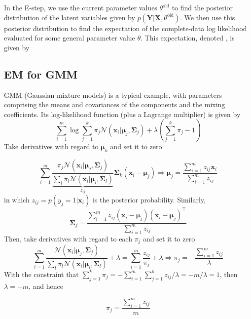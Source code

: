 \documentclass{article}
\begin{document}
	In the E-step, we use the current parameter values $\theta^{\mathrm{old}}$ to find the posterior distribution of the latent variables given by $p(\bm{Y}|\bm{X}, \theta^{\mathrm{old}})$. We then use this posterior distribution to find the expectation of the complete-data log likelihood evaluated for some general parameter value $\theta$. This expectation, denoted , is given by
	
	\subsection{EM for GMM}
	
	GMM (Gaussian mixture models) is a typical example, with parameters comprising the means and covariances of the components and the mixing coefficients. Its log-likelihood function (plus a Lagrange multiplier) is given by
	\begin{equation*}
	\sum_{i=1}^m \log \sum_{j=1}^k \pi_j \mathcal{N} (\bm{x}_i|\bm{\mu}_j,\bm{\Sigma}_j) + \lambda \left(\sum_{j=1}^k \pi_j - 1\right)
	\end{equation*}
	Take derivatives with regard to $\bm{\mu}_k$ and set it to zero
	
	\begin{equation}
	\label{eq:GMM_mu}
	\sum_{i=1}^m \underbrace{\frac{\pi_j  \mathcal{N} (\bm{x}_i|\bm{\mu}_j,\bm{\Sigma}_j)}{\sum_l \pi_l \mathcal{N} (\bm{x}_i|\bm{\mu}_l,\bm{\Sigma}_l)}}_{z_{ij}} \bm{\Sigma}_k (\bm{x}_i - \bm{\mu}_j) \Longrightarrow \bm{\mu}_j=\frac{\sum_{i=1}^m z_{ij} \bm{x}_i}{\sum_{i=1}^m z_{ij}}
	\end{equation}
in which $z_{ij}=p(y_j=1|\bm{x}_i)$ is the posterior probability. Similarly,
	\begin{equation}
	\label{eq:GMM_sigma}
	\bm{\Sigma}_j=\frac{\sum_{i=1}^m z_{ij} (\bm{x}_i-\bm{\mu}_j)(\bm{x}_i-\bm{\mu}_j)^\top}{\sum_{i=1}^m z_{ij}}
	\end{equation}
	Then, take derivatives with regard to each $\pi_j$ and set it to zero
	\begin{equation*}
	\sum_{i=1}^m \frac{\mathcal{N} (\bm{x}_i|\bm{\mu}_j,\bm{\Sigma}_j) }{\sum_l \pi_l \mathcal{N} (\bm{x}_i|\bm{\mu}_l,\bm{\Sigma}_l)} + \lambda = \sum_{i=1}^m \frac{z_{ij}}{\pi_j} + \lambda \Longrightarrow \pi_j=-\frac{\sum_{i=1}^m z_{ij}}{\lambda}
	\end{equation*}
With the constraint that $\sum_{j=1}^k\pi_j=-\sum_{i=1}^m\sum_{j=1}^k z_{ij}/\lambda = -m/\lambda=1$, then $\lambda=-m$, and hence

	\begin{equation}
	\label{eq:GMM_pi}
	\pi_j=\frac{\sum_{i=1}^m z_{ij}}{m}
	\end{equation}
	
\end{document}
